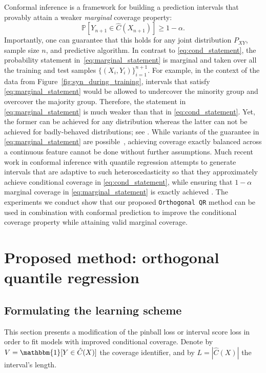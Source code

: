 \documentclass{article}
\begin{document}
Conformal inference \cite{vovk2005algorithmic} is a framework for building a prediction intervals that provably attain a weaker \emph{marginal} coverage property:
\begin{equation}\label{eq:marginal_statement}
\mathbb{P}[Y_{n+1}\in \hat{C}(X_{n+1})]\geq 1-\alpha.
\end{equation}
Importantly, one can guarantee that this holds for any joint distribution $P_{XY}$, sample size $n$, and predictive algorithm. In contrast to \eqref{eq:cond_statement}, the probability statement in~\eqref{eq:marginal_statement} is marginal and taken over all the training and test samples $\{(X_i, Y_i)\}^{n+1}_{i=1}$. For example, in the context of the data from Figure~\ref{fig:syn_during_training}, intervals that satisfy \eqref{eq:marginal_statement} would be allowed to undercover the minority group and overcover the majority group. Therefore, the statement in \eqref{eq:marginal_statement}  is much weaker than that in \eqref{eq:cond_statement}. Yet, the former can be achieved for any distribution whereas the latter can not be achieved for badly-behaved distributions; see \cite{barber2019limits, MedianInference}. While variants of the guarantee in \eqref{eq:marginal_statement} are possible~\cite{vovk_conditional_validity, equalized_cov, bates2021distributionfree}, achieving coverage exactly balanced across a continuous feature cannot be done without further assumptions.
Much recent work in conformal inference with quantile regression attempts to generate intervals that are adaptive to such heteroscedasticity so that they approximately achieve conditional coverage in \eqref{eq:cond_statement}, while ensuring that $1-\alpha$ marginal coverage in \eqref{eq:marginal_statement} is exactly achieved \cite{CQR,flexible_pred_bands,comparison_conformal,adaptive_intervals,dist_conformal_pred,nested_conformal,conformal_regions}. The experiments we conduct show that our proposed \texttt{Orthogonal QR} method can be used in combination with conformal prediction to improve the conditional coverage property while attaining valid marginal coverage.

\section{Proposed method: orthogonal quantile regression}
\label{sec:method}

\subsection{Formulating the learning scheme}
This section presents a modification of the pinball loss or interval score loss in order to fit models with improved conditional coverage. 
Denote by $V=\mathbbm{1}[Y \in  \hat{C}(X)]$ the coverage identifier, and by $L=|\hat{C}(X)|$ the interval's length.
\end{document}
